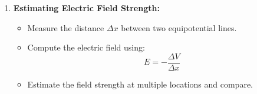 \documentclass[idxtotoc,hyperref,openany]{labbook} %
\begin{document}
\begin{enumerate}
\begin{enumerate}[$\bullet$]
    \end{enumerate}
    \item \textbf{Estimating Electric Field Strength:}
    \begin{itemize}
    \item Measure the distance $\Delta x$ between two equipotential lines.
    \item Compute the electric field using:
    \begin{equation}
        E = -\frac{\Delta V}{\Delta x}
    \end{equation}
    \item Estimate the field strength at multiple locations and compare.
    \end{itemize}
\end{enumerate}








\end{document}
